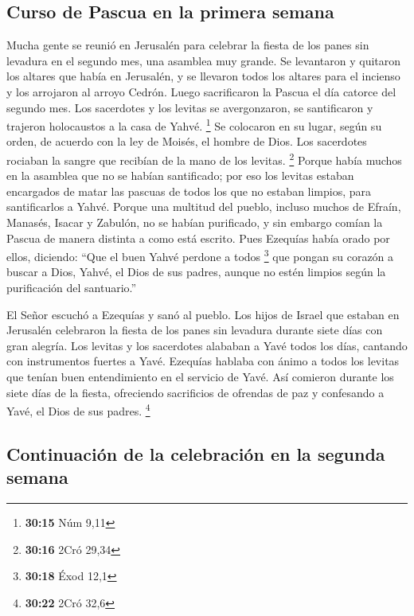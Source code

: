 \hypertarget{curso-de-pascua-en-la-primera-semana}{%
\subsection{Curso de Pascua en la primera
semana}\label{curso-de-pascua-en-la-primera-semana}}

 Mucha gente se reunió en Jerusalén para celebrar la
fiesta de los panes sin levadura en el segundo mes, una asamblea muy
grande.  Se levantaron y quitaron los altares que había
en Jerusalén, y se llevaron todos los altares para el incienso y los
arrojaron al arroyo Cedrón.  Luego sacrificaron la Pascua
el día catorce del segundo mes. Los sacerdotes y los levitas se
avergonzaron, se santificaron y trajeron holocaustos a la casa de Yahvé.
\footnote{\textbf{30:15} Núm 9,11}  Se colocaron en su
lugar, según su orden, de acuerdo con la ley de Moisés, el hombre de
Dios. Los sacerdotes rociaban la sangre que recibían de la mano de los
levitas. \footnote{\textbf{30:16} 2Cró 29,34}  Porque
había muchos en la asamblea que no se habían santificado; por eso los
levitas estaban encargados de matar las pascuas de todos los que no
estaban limpios, para santificarlos a Yahvé.  Porque una
multitud del pueblo, incluso muchos de Efraín, Manasés, Isacar y
Zabulón, no se habían purificado, y sin embargo comían la Pascua de
manera distinta a como está escrito. Pues Ezequías había orado por
ellos, diciendo: ``Que el buen Yahvé perdone a todos \footnote{\textbf{30:18}
  Éxod 12,1}  que pongan su corazón a buscar a Dios,
Yahvé, el Dios de sus padres, aunque no estén limpios según la
purificación del santuario.''

 El Señor escuchó a Ezequías y sanó al pueblo.
 Los hijos de Israel que estaban en Jerusalén celebraron
la fiesta de los panes sin levadura durante siete días con gran alegría.
Los levitas y los sacerdotes alababan a Yavé todos los días, cantando
con instrumentos fuertes a Yavé.  Ezequías hablaba con
ánimo a todos los levitas que tenían buen entendimiento en el servicio
de Yavé. Así comieron durante los siete días de la fiesta, ofreciendo
sacrificios de ofrendas de paz y confesando a Yavé, el Dios de sus
padres. \footnote{\textbf{30:22} 2Cró 32,6}

\hypertarget{continuaciuxf3n-de-la-celebraciuxf3n-en-la-segunda-semana}{%
\subsection{Continuación de la celebración en la segunda
semana}\label{continuaciuxf3n-de-la-celebraciuxf3n-en-la-segunda-semana}}

